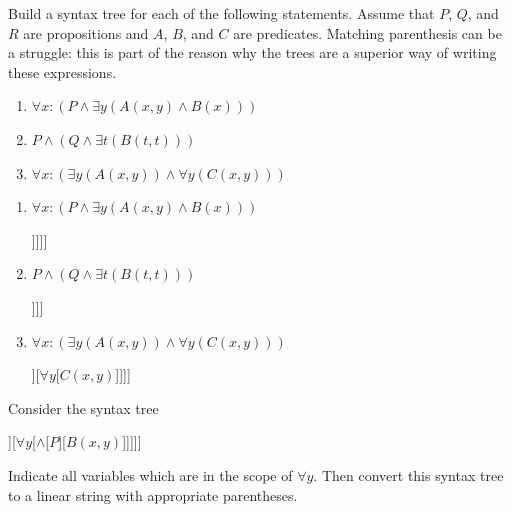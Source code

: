 \begin{xca}
	Build a syntax tree for each of the following statements.  Assume that $P$, $Q$, and $R$ are propositions and $A$, $B$, and $C$ are predicates.  Matching parenthesis can be a struggle:  this is part of the reason why the trees are a superior way of writing these expressions.
	
	\begin{enumerate}
		\item $\forall x:  (P \wedge \exists y (A(x,y) \wedge B(x)))$
		\item $P \wedge (Q \wedge \exists t (B(t,t)) )$
		\item $\forall x: ( \exists y (A(x,y)) \wedge \forall y (C(x,y)))$
	\end{enumerate}
\end{xca}


\begin{solutions}
	\begin{enumerate}
		\item $\forall x:  (P \wedge \exists y (A(x,y) \wedge B(x)))$
		
		\begin{center}
			\begin{forest}
				[\(\forall x\)[\(\wedge\)[\(P\)][\(\exists y\)[\(\wedge\)[\({A(x,y)}\)][\(B(x)\)]]]]]
			\end{forest}
		\end{center}
		\item $P \wedge (Q \wedge \exists t (B(t,t)) )$
		
		\begin{center}
			\begin{forest}
				[\(\wedge\)[\(P\)][\(\wedge\)[\(Q\)][\(\exists t\)[\({B(t,t)}\)]]]]
			\end{forest}
		\end{center}
		\item $\forall x: ( \exists y (A(x,y)) \wedge \forall y (C(x,y)))$
		
		\begin{center}
			\begin{forest}
				[\(\forall x\)[\(\wedge\)[\(\exists y\)[\({A(x,y)}\)]][\(\forall y\)[\({C(x,y)}\)]]]]
			\end{forest}
		\end{center}
		
	\end{enumerate}
\end{solutions}

\begin{xca}
	Consider the syntax tree
	
	\begin{center}
		\begin{forest}
			[$\forall x$[$\wedge$[$\exists y$[${A(x,y)}$]][$\forall y$[$\wedge$[$P$][${B(x,y)}$]]]]]
		\end{forest}
	\end{center}
	
	Indicate all variables which are in the scope of $\forall y$.  Then convert this syntax tree to a linear string with appropriate parentheses. 
	
\end{xca}

